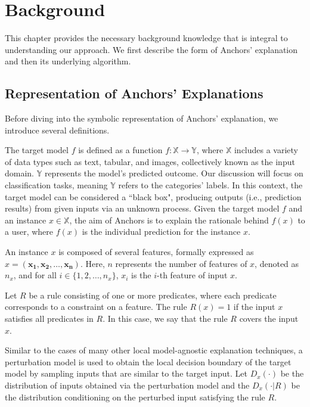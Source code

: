 \section{Background}

This chapter provides the necessary background knowledge that is integral to understanding our approach. We first describe the form of Anchors' explanation and then its underlying algorithm.

\subsection{Representation of Anchors' Explanations}

Before diving into the symbolic representation of Anchors' explanation, we introduce several definitions.

The target model $f$ is defined as a function $f:\mathbb{X}\rightarrow \mathbb{Y}$, where $\mathbb{X}$ includes a variety of data types such as text, tabular, and images, collectively known as the input domain. $\mathbb{Y}$ represents the model's predicted outcome. Our discussion will focus on classification tasks, meaning $\mathbb{Y}$ refers to the categories' labels. In this context, the target model can be considered a ``black box", producing outputs (i.e., prediction results) from given inputs via an unknown process. Given the target model $f$ and an instance $x \in \mathbb{X}$, the aim of Anchors is to explain the rationale behind $f(x)$ to a user, where $f(x)$ is the individual prediction for the instance $x$.

An instance $x$ is composed of several features, formally expressed as $x = \boldsymbol{(x_1, x_2, \dots, x_n)}$. Here, $n$ represents the number of features of $x$, denoted as $n_x$, and for all $i \in \{1, 2, \dots, n_x\}$, $x_i$ is the $i$-th feature of input $x$.

Let $R$ be a rule consisting of one or more predicates, where each predicate corresponds to a constraint on a feature. The rule $R(x)=1$ if the input $x$ satisfies all predicates in $R$. In this case, we say that the rule $R$ covers the input $x$.


Similar to the cases of many other local model-agnostic explanation techniques, a perturbation model 
is used to obtain the local decision boundary of the target model by sampling inputs that are similar to the target input. Let $D_x(\cdot)$ be the distribution of inputs obtained via the perturbation model and the $D_x(\cdot|R)$ be the distribution  conditioning on the perturbed input satisfying the rule $R$.

